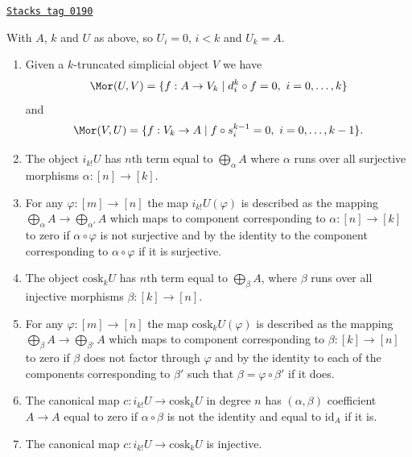 \begin{lemma}
\label{simplicial-lemma-eilenberg-maclane-object}
\href{https://stacks.math.columbia.edu/tag/0190}{\texttt{Stacks tag 0190}}

With $A$, $k$ and $U$ as above, so $U_i = 0$, $i < k$ and $U_k = A$.
\begin{enumerate}
\item Given a $k$-truncated simplicial object $V$
we have
$$
\Mor(U, V)
=
\{ f : A \to V_k \mid d^k_i \circ f = 0, \ i = 0, \ldots, k \}
$$
and
$$
\Mor(V, U)
=
\{ f : V_k \to A \mid f \circ s^{k - 1}_i = 0, \ i = 0, \ldots, k - 1 \}.
$$
\item The object $i_{k!} U$ has $n$th term equal to
$\bigoplus_\alpha A$ where $\alpha$ runs over all
surjective morphisms $\alpha : [n] \to [k]$.
\item For any $\varphi : [m] \to [n]$ the map
$i_{k!} U(\varphi)$ is described as the mapping
$\bigoplus_\alpha A \to \bigoplus_{\alpha'} A$
which maps to component corresponding to $\alpha : [n] \to [k]$
to zero if $\alpha \circ \varphi$ is not surjective and
by the identity to the component corresponding to
$\alpha \circ \varphi$ if it is surjective.
\item The object $\text{cosk}_k U$ has $n$th term equal to
$\bigoplus_\beta A$, where $\beta$ runs over all
injective morphisms $\beta : [k] \to [n]$.
\item For any $\varphi : [m] \to [n]$ the map
$\text{cosk}_k U(\varphi)$ is described as the mapping
$\bigoplus_\beta A \to \bigoplus_{\beta'} A$
which maps to component corresponding to $\beta : [k] \to [n]$
to zero if $\beta$ does not factor through $\varphi$ and
by the identity to each of the components corresponding to
$\beta'$ such that $\beta = \varphi \circ \beta'$
if it does.
\item The canonical map
$
c : i_{k !} U \to \text{cosk}_k U
$
in degree $n$ has $(\alpha, \beta)$ coefficient $A \to A$
equal to zero if $\alpha \circ \beta$ is not the identity
and equal to $\text{id}_A$ if it is.
\item The canonical map
$
c : i_{k !} U \to \text{cosk}_k U
$
is injective.
\end{enumerate}
\end{lemma}

